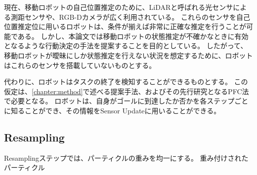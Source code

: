 現在、移動ロボットの自己位置推定のために、LiDARと呼ばれる光センサによる測距センサや、RGB-Dカメラが広く利用されている。
これらのセンサを自己位置推定位に用いるロボットは、条件が揃えば非常に正確な推定を行うことが可能である。
しかし、本論文では移動ロボットの状態推定が不確かなときに有効となるような行動決定の手法を提案することを目的としている。
したがって、移動ロボットが曖昧にしか状態推定を行えない状況を想定するために、ロボットはこれらのセンサを搭載していないものとする。

代わりに、ロボットはタスクの終了を検知することができるものとする。
この仮定は、\ref{chapter:method}で述べる提案手法、およびその先行研究となるPFC法で必要となる。
ロボットは、自身がゴールに到達したか否かを各ステップごとに知ることができ、その情報をSensor Updateに用いることができる。

\subsection{Resampling}
Resamplingステップでは、パーティクルの重みを均一にする。
重み付けされたパーティクル
